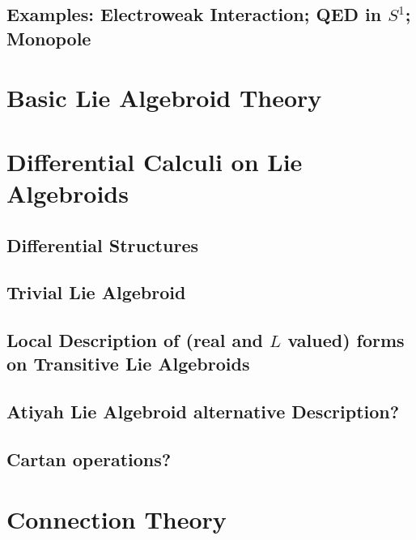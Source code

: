 \documentclass[12pt]{report}
\theoremstyle{definition}
\begin{document}
\section{Examples: Electroweak Interaction; QED in $S^1$; Monopole}

\chapter{Basic Lie Algebroid Theory}\label{chp:basicLie}


\chapter{Differential Calculi on Lie Algebroids}\label{chp:diffStruc}

\section{Differential Structures}
\section{Trivial Lie Algebroid}
\section{Local Description of (real and $L$ valued) forms on Transitive Lie Algebroids}
\section{Atiyah Lie Algebroid alternative Description?}
\section{Cartan operations?}



\chapter{Connection Theory}\label{chp:connections}

\end{document}

